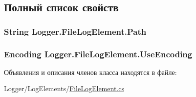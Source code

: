 \subsection{Полный список свойств}
\hypertarget{class_logger_1_1_file_log_element_acaa405b2fa63d634684900980a2b7821}{}
\subsubsection[{Path}]{\setlength{\rightskip}{0pt plus 5cm}String Logger.\+File\+Log\+Element.\+Path\hspace{0.3cm}{\ttfamily [get]}}\label{class_logger_1_1_file_log_element_acaa405b2fa63d634684900980a2b7821}
\hypertarget{class_logger_1_1_file_log_element_a117b230e3fdc8707b3d9291d46627a74}{}
\subsubsection[{Use\+Encoding}]{\setlength{\rightskip}{0pt plus 5cm}Encoding Logger.\+File\+Log\+Element.\+Use\+Encoding\hspace{0.3cm}{\ttfamily [get]}}\label{class_logger_1_1_file_log_element_a117b230e3fdc8707b3d9291d46627a74}


Объявления и описания членов класса находятся в файле\+:\begin{DoxyCompactItemize}
\item 
Logger/\+Log\+Elements/\hyperlink{_file_log_element_8cs}{File\+Log\+Element.\+cs}\end{DoxyCompactItemize}
